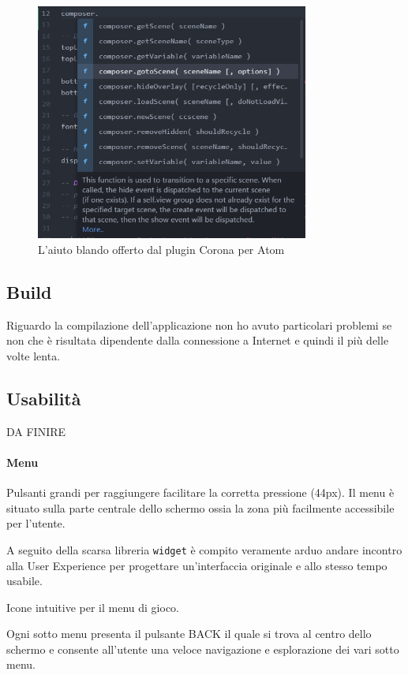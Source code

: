 			\begin{figure} [t]
				\centering
				\includegraphics[width=0.8\textwidth]{img/atomPlugin}
				\caption{L'aiuto blando offerto dal plugin Corona per Atom}
				\label{fig:atomPlugin}
			\end{figure}
		
		\subsection{Build}
			Riguardo la compilazione dell'applicazione non ho avuto particolari problemi se non che è risultata dipendente dalla connessione a Internet e quindi il più delle volte lenta. 
	
	
	\subsection{Usabilità}
		DA FINIRE
	
		\paragraph{Menu}
		
		Pulsanti grandi per raggiungere facilitare la corretta pressione (44px).
		Il menu è situato sulla parte centrale dello schermo ossia la zona più facilmente accessibile per l'utente.
		
		A seguito della scarsa libreria \verb|widget| è compito veramente arduo andare incontro alla User Experience per progettare un'interfaccia originale e allo stesso tempo usabile. 
		
		Icone intuitive per il menu di gioco.
		
		Ogni sotto menu presenta il pulsante BACK il quale si trova al centro dello schermo e consente all'utente una veloce navigazione e esplorazione dei vari sotto menu.
		
